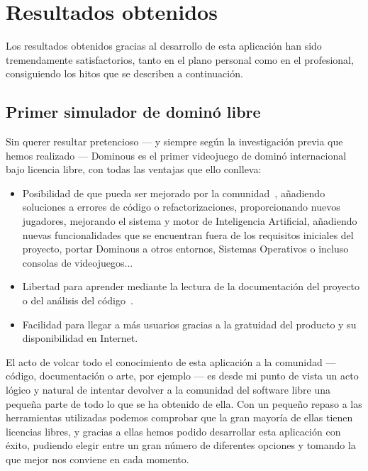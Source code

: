 

\section{Resultados obtenidos}

Los resultados obtenidos gracias al desarrollo de esta aplicación han sido tremendamente satisfactorios, tanto en el
plano personal como en el profesional, consiguiendo los hitos que se describen a continuación. \\

\subsection{Primer simulador de dominó libre}

Sin querer resultar pretencioso --- y siempre según la investigación previa que hemos realizado --- Dominous es el primer
videojuego de dominó internacional bajo licencia libre, con todas las ventajas que ello conlleva:

\begin{itemize}
    \item Posibilidad de que pueda ser mejorado por la comunidad~\cite{raymond01a}, añadiendo soluciones a errores de código o refactorizaciones, proporcionando nuevos jugadores, mejorando el sistema y motor de Inteligencia Artificial, añadiendo nuevas
        funcionalidades que se encuentran fuera de los requisitos iniciales del proyecto, portar Dominous a otros
        entornos, Sistemas Operativos o incluso consolas de videojuegos...
    \item Libertad para aprender mediante la lectura de la documentación del proyecto o del análisis del código~\cite{sobre_swlibre_2004}.
    \item Facilidad para llegar a más usuarios gracias a la gratuidad del producto y su disponibilidad en Internet.
\end{itemize}

El acto de volcar todo el conocimiento de esta aplicación a la comunidad --- código, documentación o arte, por ejemplo --- es desde
mi punto de vista un acto lógico y natural de intentar devolver a la comunidad del software libre una pequeña 
parte de todo lo que se ha obtenido de ella. Con un pequeño repaso a las herramientas utilizadas podemos comprobar
que la gran mayoría de ellas tienen licencias libres, y gracias a ellas hemos podido desarrollar esta aplicación con éxito,
pudiendo elegir entre un gran número de diferentes opciones y tomando la que mejor nos conviene en cada momento.


